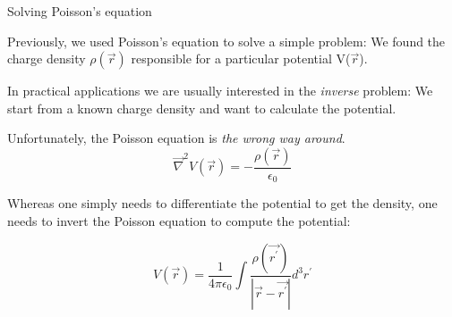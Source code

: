 \begin{frame}{Solving Poisson's equation}

Previously, we used Poisson's equation to solve a simple problem:
We found the charge density $\rho(\vec{r})$ responsible for a particular potential V($\vec{r}$).\\

\vspace{0.2cm}

In practical applications we are usually interested in the {\em inverse} problem:
We start from a known charge density and want to calculate the potential.\\

\vspace{0.2cm}

Unfortunately, the Poisson equation is {\em the wrong way around}.
\begin{equation*}
   \vec{\nabla}^{2} V(\vec{r}) = -\frac{\rho(\vec{r})}{\epsilon_0}
\end{equation*}

Whereas one simply needs to differentiate the potential to get the density,
one needs to invert the Poisson equation to compute the potential:

\begin{equation*}
   V(\vec{r}) = \frac{1}{4\pi\epsilon_0} \int \frac{\rho(\vec{r^{\prime}})}{|\vec{r}-\vec{r^{\prime}}|} d^{3}r^{\prime}
\end{equation*}

\end{frame}


%
%
%

